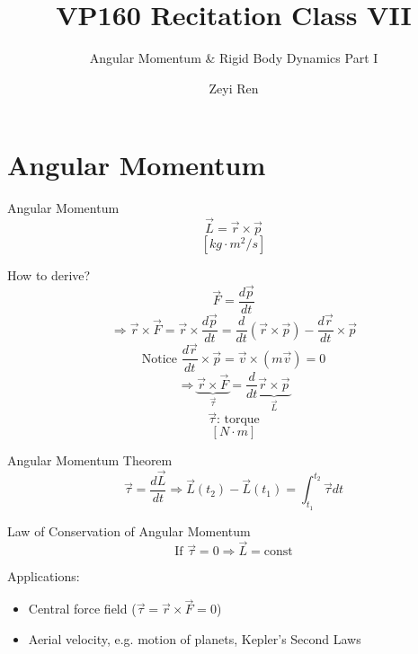 \documentclass{beamer}
\title{VP160 Recitation Class VII}
\subtitle{Angular Momentum \& Rigid Body Dynamics Part I}
\author{Zeyi Ren}
\institute{UM-SJTU Joint Institute}
\begin{document}
\maketitle

\frame{\tableofcontents}

\section{Angular Momentum}
\begin{frame}
  \begin{block}{Angular Momentum}
    $$\vec{L} = \vec{r}\times \vec{p}$$
    $$[kg\cdot m^2/s]$$
  \end{block}
  \pause
How to derive?
$$\vec{F} = \frac{d\vec{p}}{dt}$$\pause
$$\Rightarrow \vec{r}\times \vec{F} = \vec{r}\times \frac{d\vec{p}}{dt} = \frac{d}{dt}(\vec{r}\times \vec{p}) - \frac{d\vec{r}}{dt}\times \vec{p}$$\pause
$$
\text{Notice }\frac{d\vec{r}}{dt}\times \vec{p}=\vec{v}\times (m\vec{v}) = 0 
$$\pause
$$\Rightarrow \underbrace{\vec{r}\times \vec{F}}_{\vec{\tau}} = \frac{d}{dt}\underbrace{\vec{r}\times \vec{p}}_{\vec{L}}$$
$$\vec{\tau}\text{: torque}$$
$$[N\cdot m]$$
\end{frame}

\begin{frame}
  \begin{block}{Angular Momentum Theorem}
    $$\vec{\tau} = \frac{d\vec{L}}{dt}\Rightarrow \vec{L}(t_2) - \vec{L}(t_1) = \int_{t_1}^{t_2}\vec{\tau}dt$$
  \end{block}\pause
  \begin{block}{Law of Conservation of Angular Momentum}
    $$\text{If }\vec{\tau} = 0\Rightarrow \vec{L} = \text{const}$$
  \end{block}\pause
  Applications: 
  \begin{itemize}
    \item Central force field ($\vec{\tau} = \vec{r}\times \vec{F} = 0$)\pause
    \item Aerial velocity, e.g. motion of planets, Kepler's Second Laws 
  \end{itemize}
\end{frame}
\end{document}
